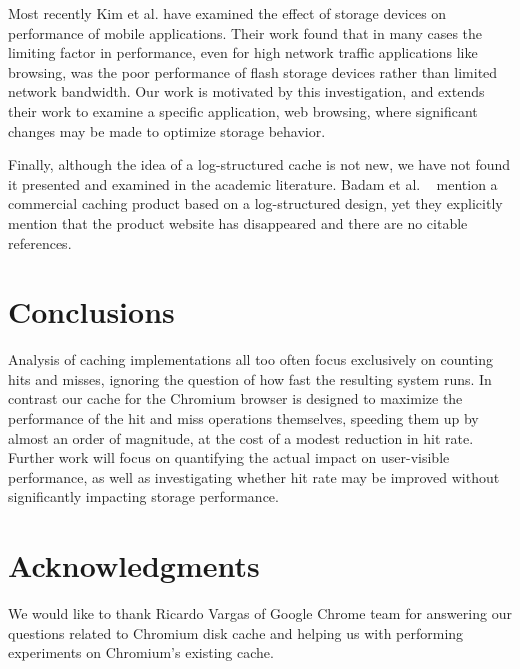 \documentclass{sig-alternate}
\begin{document}
Most recently Kim et al. \cite{kim12} have examined the effect of storage
devices on performance of mobile applications. Their work found that in many
cases the limiting factor in performance, even for high network traffic
applications like browsing, was the poor performance of flash storage devices
rather than limited network bandwidth. Our work is motivated by this
investigation, and extends their work to examine a specific application, web
browsing, where significant changes may be made to optimize storage behavior.

Finally, although the idea of a log-structured cache is not new, we have not
found it presented and examined in the academic literature.  Badam et
al. ~\cite{hashcache} mention a commercial caching product based on a
log-structured design, yet they explicitly mention that the product website has
disappeared and there are no citable references.

\section{Conclusions}

Analysis of caching implementations all too often focus exclusively on
counting hits and misses, ignoring the question of how fast the
resulting system runs. In contrast our cache for the Chromium browser
is designed to maximize the performance of the hit and miss operations
themselves, speeding them up by almost an order of magnitude, at the
cost of a modest reduction in hit rate. Further work will focus on
quantifying the actual impact on user-visible performance, as well as
investigating whether hit rate may be improved without significantly
impacting storage performance.

\section*{Acknowledgments}

We would like to thank Ricardo Vargas of Google Chrome team for answering our
questions related to Chromium disk cache and helping us with performing
experiments on Chromium's existing cache.

%

%
%
\end{document}
